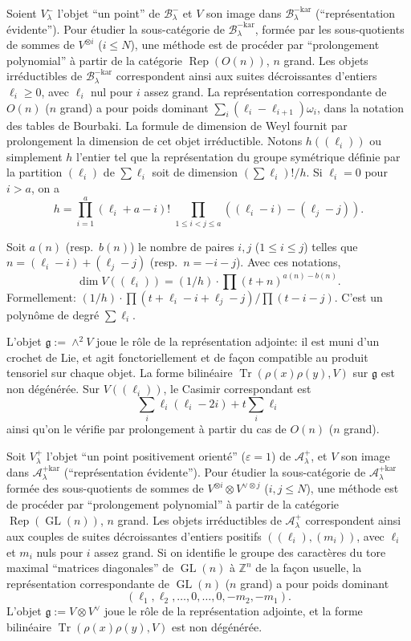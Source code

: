 \documentclass[11pt,a4paper]{article}
\DeclareMathOperator{\Tr}{Tr}
\DeclareMathOperator{\Rep}{Rep}
\DeclareMathOperator{\GL}{GL}
\newcommand{\frg}{\mathfrak{g}}
\newcommand{\Z}{\mathbb{Z}}
\begin{document}
Soient $V_\lambda^-$ l'objet ``un point'' de $\mathcal{B}_\lambda^-$ et $V$ son image dans $\mathcal{B}_\lambda^{-\text{kar}}$ (``repr\'esentation \'evidente''). Pour \'etudier la sous-cat\'egorie de $\mathcal{B}_\lambda^{-\text{kar}}$, form\'ee par les sous-quotients de sommes de $V^{\otimes i}$ ($i \leq N$), une m\'ethode est de proc\'eder par ``prolongement polynomial'' \`a partir de la cat\'egorie $\Rep(O(n))$, $n$ grand. Les objets irr\'eductibles de $\mathcal{B}_\lambda^{-\text{kar}}$ correspondent ainsi aux suites d\'ecroissantes d'entiers $\ell_i \geq 0$, avec $\ell_i$ nul pour $i$ assez grand. La repr\'esentation correspondante de $O(n)$ ($n$ grand) a pour poids dominant $\sum_i (\ell_i - \ell_{i+1})\omega_i$, dans la notation des tables de Bourbaki. La formule de dimension de Weyl fournit par prolongement la dimension de cet objet irr\'eductible. Notons $h((\ell_i))$ ou simplement $h$ l'entier tel que la repr\'esentation du groupe sym\'etrique d\'efinie par la partition $(\ell_i)$ de $\sum \ell_i$ soit de dimension $(\sum \ell_i)!/h$. Si $\ell_i = 0$ pour $i > a$, on a
$$
h = \prod_{i=1}^a (\ell_i + a - i)! \; \prod_{1 \leq i < j \leq a} ((\ell_i - i) - (\ell_j - j)).
$$

Soit $a(n)$ (resp.~$b(n)$) le nombre de paires $i, j$ ($1 \leq i \leq j$) telles que $n = (\ell_i - i) + (\ell_j - j)$ (resp.~$n = -i - j$). Avec ces notations,
$$
\dim V((\ell_i)) = (1/h) \cdot \prod (t + n)^{a(n) - b(n)}.
$$
Formellement: $(1/h) \cdot \prod (t + \ell_i - i + \ell_j - j) / \prod (t - i - j)$. C'est un polyn\^ome de degr\'e $\sum \ell_i$.

L'objet $\frg := \wedge^2 V$ joue le r\^ole de la repr\'esentation adjointe: il est muni d'un crochet de Lie, et agit fonctoriellement et de fa\c{c}on compatible au produit tensoriel sur chaque objet. La forme bilin\'eaire $\Tr(\rho(x)\rho(y), V)$ sur $\frg$ est non d\'eg\'en\'er\'ee. Sur $V((\ell_i))$, le Casimir correspondant est
$$
\sum_i \ell_i(\ell_i - 2i) + t \sum_i \ell_i
$$
ainsi qu'on le v\'erifie par prolongement \`a partir du cas de $O(n)$ ($n$ grand).

Soit $V_\lambda^+$ l'objet ``un point positivement orient\'e'' ($\varepsilon = 1$) de $\mathcal{A}_\lambda^+$, et $V$ son image dans $\mathcal{A}_\lambda^{+\text{kar}}$ (``repr\'esentation \'evidente''). Pour \'etudier la sous-cat\'egorie de $\mathcal{A}_\lambda^{+\text{kar}}$ form\'ee des sous-quotients de sommes de $V^{\otimes i} \otimes V^{\vee \otimes j}$ ($i, j \leq N$), une m\'ethode est de proc\'eder par ``prolongement polynomial'' \`a partir de la cat\'egorie $\Rep(\GL(n))$, $n$ grand. Les objets irr\'eductibles de $\mathcal{A}_\lambda^{+}$ correspondent ainsi aux couples de suites d\'ecroissantes d'entiers positifs $((\ell_i), (m_i))$, avec $\ell_i$ et $m_i$ nuls pour $i$ assez grand. Si on identifie le groupe des caract\`eres du tore maximal ``matrices diagonales'' de $\GL(n)$ \`a $\Z^n$ de la fa\c{c}on usuelle, la repr\'esentation correspondante de $\GL(n)$ ($n$ grand) a pour poids dominant
$$
(\ell_1, \ell_2, \ldots, 0, \ldots, 0, -m_2, -m_1).
$$
L'objet $\frg := V \otimes V^\vee$ joue le r\^ole de la repr\'esentation adjointe, et la forme bilin\'eaire $\Tr(\rho(x)\rho(y), V)$ est non d\'eg\'en\'er\'ee.
\end{document}
